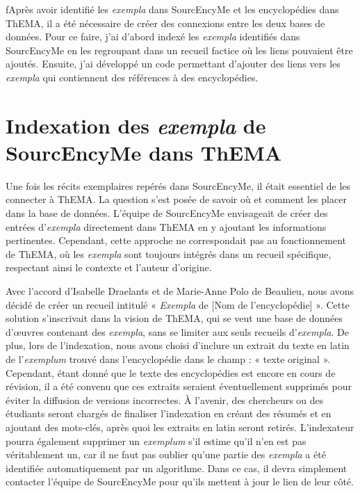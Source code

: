 fAprès avoir identifié les \textit{exempla} dans SourcEncyMe et les encyclopédies dans ThEMA, il a été nécessaire de créer des connexions entre les deux bases de données. Pour ce faire, j’ai d'abord indexé les \textit{exempla} identifiés dans SourcEncyMe en les regroupant dans un recueil factice où les liens pouvaient être ajoutés. Ensuite, j'ai développé un code permettant d'ajouter des liens vers les \textit{exempla} qui contiennent des références à des encyclopédies.


\section{Indexation des \textit{exempla} de SourcEncyMe dans ThEMA}
Une fois les récits exemplaires repérés dans SourcEncyMe, il était essentiel de les connecter à ThEMA. La question s’est posée de savoir où et comment les placer dans la base de données. L'équipe de SourcEncyMe envisageait de créer des entrées d’\textit{exempla} directement dans ThEMA en y ajoutant les informations pertinentes. Cependant, cette approche ne correspondait pas au fonctionnement de ThEMA, où les \textit{exempla} sont toujours intégrés dans un recueil spécifique, respectant ainsi le contexte et l’auteur d'origine.

Avec l'accord d'Isabelle Draelants et de Marie-Anne Polo de Beaulieu, nous avons décidé de créer un recueil intitulé « \textit{Exempla} de [Nom de l'encyclopédie] ». Cette solution s'inscrivait dans la vision de ThEMA, qui se veut une base de données d’œuvres contenant des \textit{exempla}, sans se limiter aux seuls recueils d'\textit{exempla}. De plus, lors de l'indexation, nous avons choisi d’inclure un extrait du texte en latin de l'\textit{exemplum} trouvé dans l'encyclopédie dans le champ : « texte original ». Cependant, étant donné que le texte des encyclopédies est encore en cours de révision, il a été convenu que ces extraits seraient éventuellement supprimés pour éviter la diffusion de versions incorrectes. À l'avenir, des chercheurs ou des étudiants seront chargés de finaliser l'indexation en créant des résumés et en ajoutant des mots-clés, après quoi les extraits en latin seront retirés. L'indexateur pourra également supprimer un \textit{exemplum} s'il estime qu'il n'en est pas véritablement un, car il ne faut pas oublier qu'une partie des \textit{exempla} a été identifiée automatiquement par un algorithme. Dans ce cas, il devra simplement contacter l'équipe de SourcEncyMe pour qu'ils mettent à jour le lien de leur côté.


